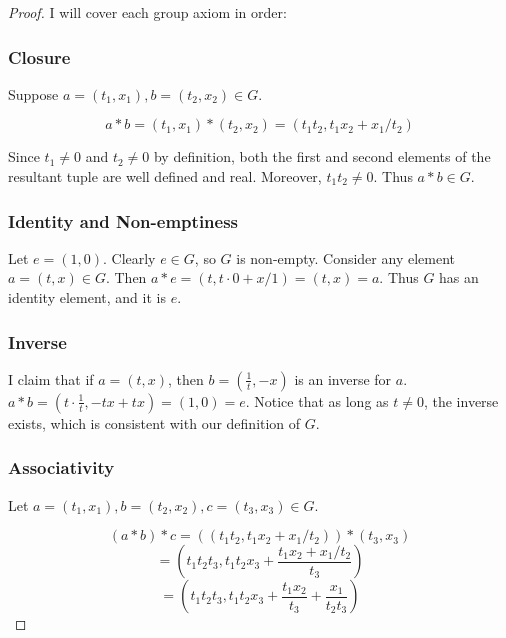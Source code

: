 \documentclass[a4paper,12pt]{article}
\begin{document}
\begin{proof}
I will cover each group axiom in order:

\subsubsection*{Closure}

Suppose $a = (t_1, x_1), b = (t_2, x_2) \in G$. 

\begin{equation*}
a \ast b = ( t_1 , x_1 ) \ast ( t_2 , x_2 ) = (t_1 t_2 , t_1 x_2 + x_1 / t_2 )
\end{equation*}

Since $t_1 \neq 0$ and $t_2 \neq 0$ by definition, both the first and second elements of the resultant tuple are well defined and real. Moreover, $t_1t_2 \neq 0$. Thus $a \ast b \in G$.

\subsubsection*{Identity and Non-emptiness}
Let $e = (1, 0)$. Clearly $e \in G$, so $G$ is non-empty. Consider any element $a = (t, x) \in G$. Then $a \ast e = (t, t \cdot 0 + x / 1) = (t, x) = a$. Thus $G$ has an identity element, and it is $e$.

\subsubsection*{Inverse}
I claim that if $a = (t, x)$, then $b = (\frac{1}{t}, -x)$ is an inverse for $a$. $a \ast b = (t \cdot \frac{1}{t}, -tx + tx) = (1, 0) = e$. Notice that as long as $t \neq 0$, the inverse exists, which is consistent with our definition of $G$.

\subsubsection*{Associativity}
Let $a = (t_1, x_1), b = (t_2, x_2), c=(t_3, x_3) \in G$.

\begin{equation*} 
(a \ast b) \ast c = ((t_1 t_2, t_1 x_2 + x_1 / t_2)) \ast (t_3, x_3)
\end{equation*}
\begin{equation*}
= (t_1 t_2 t_3, t_1 t_2 x_3 + \frac{t_1 x_2 + x_1 / t_2}{t_3})
\end{equation*}
\begin{equation} \label{1a:1}
=  (t_1 t_2 t_3, t_1 t_2 x_3 + \frac{t_1x_2}{t_3} + \frac{x_1}{t_2t_3})
\end{equation}


\end{proof}
\end{document}
